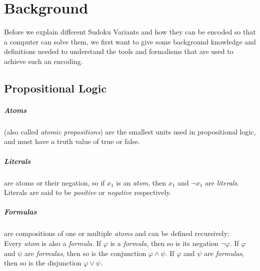 
\chapter{Background}
Before we explain different Sudoku Variants and how they can be encoded so that a computer can solve them, we first want to give some background knowledge and definitions needed to understand the tools and formalisms that are used to achieve such an encoding.

\section{Propositional Logic}

\paragraph{Atoms}
(also called \emph{atomic propositions}) are the smallest units used in propositional logic, and must have a truth value of true or false.

\paragraph{Literals}
are atoms or their negation, so if $x_1$ is an \emph{atom}, then $x_1$ and $\neg x_1$ are \emph{literals}. Literals are said to be \emph{positive} or \emph{negative} respectively.


\paragraph{Formulas} are compositions of one or multiple \emph{atoms} and can be defined recursively:\\
Every \emph{atom} is also a \emph{formula}.
If $\varphi$ is a \emph{formula}, then so is its negation $\neg\varphi$.
If $\varphi$ and $\psi$ are \emph{formulas}, then so is the conjunction $\varphi \land \psi$.
If $\varphi$ and $\psi$ are \emph{formulas}, then so is the disjunction $\varphi \lor \psi$.


